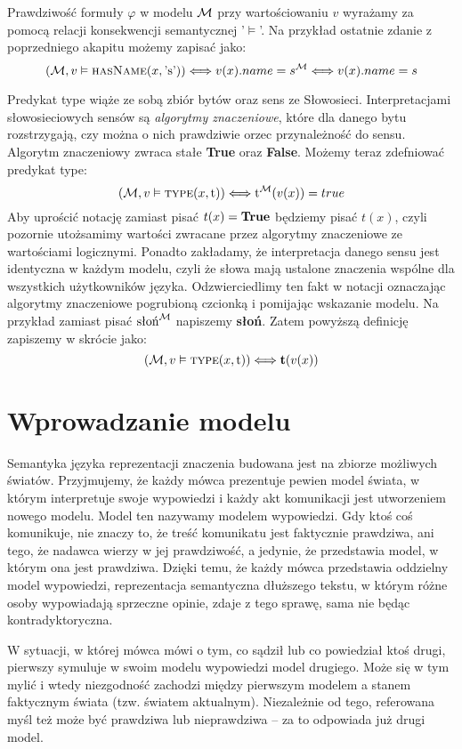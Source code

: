 \documentclass[a4paper,12pt]{article}
\newcommand{\type}[2]{\text{{\sc type}}(#1,\text{#2})}
\newcommand{\hasName}[2]{\text{{\sc hasName}}(#1,\text{'#2'})}
\begin{document}
Prawdziwość formuły $\varphi$ w modelu ${\cal M}$ przy wartościowaniu $v$ wyrażamy za pomocą relacji konsekwencji semantycznej  '$\vDash$'.
Na przykład ostatnie zdanie z poprzedniego akapitu możemy zapisać jako:
\[({\cal M},v\vDash \hasName{x}{s}) \Longleftrightarrow v(x).name=s^{\cal M} \Longleftrightarrow v(x).name=s\]

Predykat {\sc type} wiąże ze sobą zbiór bytów oraz sens ze Słowosieci.
Interpretacjami słowosieciowych sensów są {\it algorytmy znaczeniowe}, 
które dla danego bytu rozstrzygają,
czy można o nich prawdziwie orzec przynależność do sensu.%
Algorytm znaczeniowy zwraca stałe {\bf True} oraz {\bf False}.
Możemy teraz zdefniować predykat {\sc type}:
\[({\cal M},v\vDash \type{x}{t}) \Longleftrightarrow \text{t}^{\cal M}(v(x))=true\]
Aby uprościć notację zamiast pisać $t(x)={\bf True}$ będziemy pisać $t(x)$,
czyli pozornie utożsamimy wartości zwracane przez algorytmy znaczeniowe 
ze wartościami logicznymi. Ponadto zakładamy, że interpretacja 
danego sensu jest identyczna w każdym modelu, czyli że słowa mają 
ustalone znaczenia wspólne dla wszystkich użytkowników języka. 
Odzwierciedlimy ten fakt w notacji 
oznaczając algorytmy znaczeniowe pogrubioną czcionką i pomijając wskazanie modelu.
Na przykład zamiast pisać $\text{słoń}^{\cal M}$ napiszemy {\bf słoń}.
Zatem powyższą definicję zapiszemy w skrócie jako:
\[({\cal M},v\vDash \type{x}{t}) \Longleftrightarrow \text{{\bf t}}(v(x))\]

\section{Wprowadzanie modelu}
Semantyka języka reprezentacji znaczenia budowana jest na zbiorze możliwych światów.
Przyjmujemy, że każdy mówca prezentuje pewien model świata, w którym interpretuje swoje wypowiedzi i każdy akt komunikacji jest utworzeniem nowego modelu. 
Model ten nazywamy modelem wypowiedzi.
Gdy ktoś coś komunikuje, nie znaczy to, że treść komunikatu jest faktycznie prawdziwa, ani tego, że nadawca wierzy w jej prawdziwość,
a jedynie, że przedstawia model, w którym ona jest prawdziwa.
Dzięki temu, że każdy mówca przedstawia oddzielny model wypowiedzi, reprezentacja semantyczna dłuższego tekstu, 
w którym różne osoby wypowiadają sprzeczne opinie, zdaje z tego sprawę, sama nie będąc kontradyktoryczna.

W sytuacji, w której mówca mówi o tym, co sądził lub co powiedział ktoś drugi, pierwszy symuluje w swoim modelu wypowiedzi model drugiego. 
Może się w tym mylić i wtedy
niezgodność zachodzi między pierwszym modelem a stanem faktycznym świata (tzw. światem aktualnym).
Niezależnie od tego, referowana myśl też może być prawdziwa lub nieprawdziwa -- za to odpowiada już drugi model.
\end{document}
